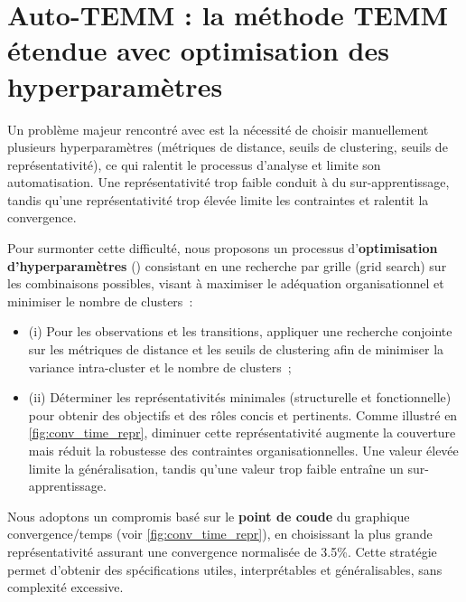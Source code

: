 \section{Auto-TEMM : la méthode TEMM étendue avec optimisation des hyperparamètres}

Un problème majeur rencontré avec  est la nécessité de choisir manuellement plusieurs hyperparamètres (métriques de distance, seuils de clustering, seuils de représentativité), ce qui ralentit le processus d'analyse et limite son automatisation. Une représentativité trop faible conduit à du sur-apprentissage, tandis qu'une représentativité trop élevée limite les contraintes et ralentit la convergence.


Pour surmonter cette difficulté, nous proposons un processus d'\textbf{optimisation d'hyperparamètres} () consistant en une recherche par grille (grid search) sur les combinaisons possibles, visant à maximiser le adéquation  organisationnel et minimiser le nombre de clusters~:

\begin{itemize}
  \item (i) Pour les observations et les transitions, appliquer une recherche conjointe sur les métriques de distance et les seuils de clustering afin de minimiser la variance intra-cluster et le nombre de clusters~;
  \item (ii) Déterminer les représentativités minimales (structurelle et fonctionnelle) pour obtenir des objectifs et des rôles concis et pertinents. Comme illustré en \autoref{fig:conv_time_repr}, diminuer cette représentativité augmente la couverture mais réduit la robustesse des contraintes organisationnelles. Une valeur élevée limite la généralisation, tandis qu'une valeur trop faible entraîne un sur-apprentissage.
\end{itemize}

Nous adoptons un compromis basé sur le \textbf{point de coude} du graphique convergence/temps (voir \autoref{fig:conv_time_repr}), en choisissant la plus grande représentativité assurant une convergence normalisée de 3.5\%. Cette stratégie permet d'obtenir des spécifications utiles, interprétables et généralisables, sans complexité excessive.


